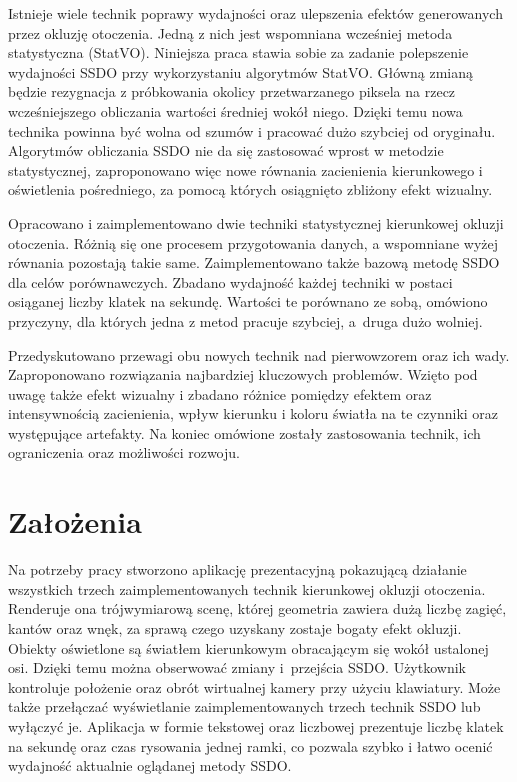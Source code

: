	Istnieje wiele technik poprawy wydajności oraz ulepszenia efektów generowanych przez okluzję otoczenia. Jedną z nich jest wspomniana wcześniej metoda statystyczna (StatVO). Niniejsza praca stawia sobie za zadanie polepszenie wydajności SSDO przy wykorzystaniu algorytmów StatVO. Główną zmianą będzie rezygnacja z próbkowania okolicy przetwarzanego piksela na rzecz wcześniejszego obliczania wartości średniej wokół niego. Dzięki temu nowa technika powinna być wolna od szumów i pracować dużo szybciej od oryginału. Algorytmów obliczania SSDO nie da się zastosować wprost w metodzie statystycznej, zaproponowano więc nowe równania zacienienia kierunkowego i oświetlenia pośredniego, za pomocą których osiągnięto zbliżony efekt wizualny.
	
	Opracowano i zaimplementowano dwie techniki statystycznej kierunkowej okluzji otoczenia. Różnią się one procesem przygotowania danych, a wspomniane wyżej równania pozostają takie same. Zaimplementowano także bazową metodę SSDO dla celów porównawczych. Zbadano wydajność każdej techniki w postaci osiąganej liczby klatek na sekundę. Wartości te porównano ze sobą, omówiono przyczyny, dla których jedna z metod pracuje szybciej, a~druga dużo wolniej. 
	
	Przedyskutowano przewagi obu nowych technik nad pierwowzorem oraz ich wady. Zaproponowano rozwiązania najbardziej kluczowych problemów. Wzięto pod uwagę także efekt wizualny i zbadano różnice pomiędzy efektem oraz intensywnością zacienienia, wpływ kierunku i koloru światła na te czynniki oraz występujące artefakty. Na koniec omówione zostały zastosowania technik, ich ograniczenia oraz możliwości rozwoju.
	
	
	\section{Założenia}
	\label{t:wprowadzenie:zalozenia}
	
	
	Na potrzeby pracy stworzono aplikację prezentacyjną pokazującą działanie wszystkich trzech zaimplementowanych technik kierunkowej okluzji otoczenia. Renderuje ona trójwymiarową scenę, której geometria zawiera dużą liczbę zagięć, kantów oraz wnęk, za sprawą czego uzyskany zostaje bogaty efekt okluzji. Obiekty oświetlone są światłem kierunkowym obracającym się wokół ustalonej osi. Dzięki temu można obserwować zmiany i~przejścia SSDO. Użytkownik kontroluje położenie oraz obrót wirtualnej kamery przy użyciu klawiatury. Może także przełączać wyświetlanie zaimplementowanych trzech technik SSDO lub wyłączyć je. Aplikacja w formie tekstowej oraz liczbowej prezentuje liczbę klatek na sekundę oraz czas rysowania jednej ramki, co pozwala szybko i łatwo ocenić wydajność aktualnie oglądanej metody SSDO.
	
